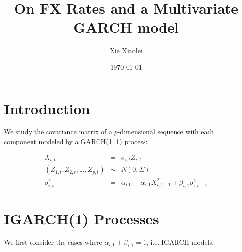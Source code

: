 \documentclass{article}
\title{On FX Rates and a Multivariate GARCH model}
\author{Xie Xiaolei}
\date{\today}
\begin{document}
\maketitle

\section{Introduction}
We study the covariance matrix of a $p$-dimensional sequence with each
component modeled by a GARCH(1, 1) process:

\begin{eqnarray*}
  X_{i,t} &=& \sigma_{i,t} Z_{i,t} \\
  (Z_{1, t}, Z_{2,t}, \dots, Z_{p,t}) &\sim& N(0, \Sigma) \\
  \sigma_{i, t}^2 &=& \alpha_{i,0} + \alpha_{i,1} X_{i, t-1}^2 + \beta_{i,1} \sigma_{i, t-1}^2
\end{eqnarray*}

\section{IGARCH(1) Processes}
We first consider the cases where $\alpha_{i, 1} + \beta_{i, 1} = 1$, i.e. IGARCH models.
\end{document}
